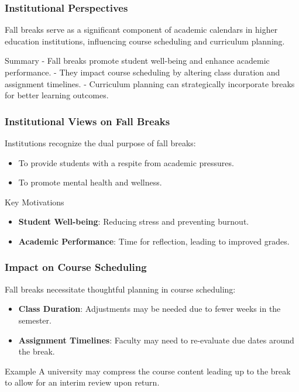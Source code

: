 \documentclass[aspectratio=169]{beamer}
\begin{document}
\begin{frame}[fragile]
    \frametitle{Institutional Perspectives}
    Fall breaks serve as a significant component of academic calendars in higher education institutions, influencing course scheduling and curriculum planning.

    \begin{block}{Summary}
    - Fall breaks promote student well-being and enhance academic performance.
    - They impact course scheduling by altering class duration and assignment timelines.
    - Curriculum planning can strategically incorporate breaks for better learning outcomes.
    \end{block}
\end{frame}

\begin{frame}[fragile]
    \frametitle{Institutional Views on Fall Breaks}
    Institutions recognize the dual purpose of fall breaks: 

    \begin{itemize}
        \item To provide students with a respite from academic pressures.
        \item To promote mental health and wellness.
    \end{itemize}

    \begin{block}{Key Motivations}
    \begin{itemize}
        \item \textbf{Student Well-being}: Reducing stress and preventing burnout.
        \item \textbf{Academic Performance}: Time for reflection, leading to improved grades.
    \end{itemize}
    \end{block}
\end{frame}

\begin{frame}[fragile]
    \frametitle{Impact on Course Scheduling}
    Fall breaks necessitate thoughtful planning in course scheduling:

    \begin{itemize}
        \item \textbf{Class Duration}: Adjustments may be needed due to fewer weeks in the semester.
        \item \textbf{Assignment Timelines}: Faculty may need to re-evaluate due dates around the break.
    \end{itemize}

    \begin{block}{Example}
    A university may compress the course content leading up to the break to allow for an interim review upon return.
    \end{block}
\end{frame}
\end{document}

